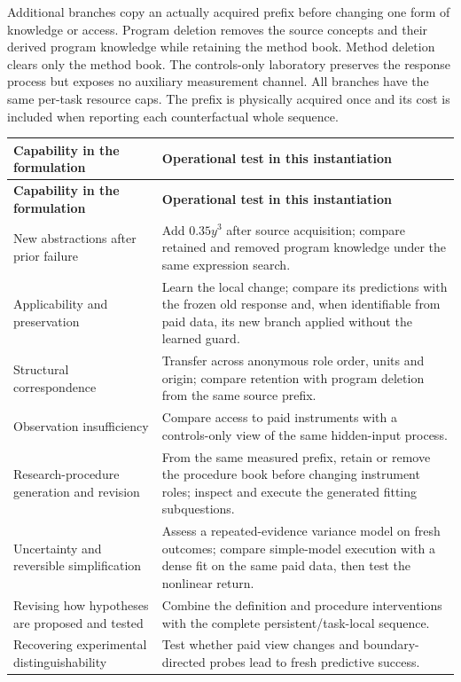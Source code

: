 \documentclass[twoside,11pt]{article}
\begin{document}
Additional branches copy an actually acquired prefix before changing one form
of knowledge or access. Program deletion removes the source concepts and their
derived program knowledge while retaining the method book. Method deletion
clears only the method book. The controls-only laboratory preserves the response
process but exposes no auxiliary measurement channel. All branches have the
same per-task resource caps. The prefix is physically acquired once and its cost
is included when reporting each counterfactual whole sequence.


\begingroup\small\setlength{\tabcolsep}{4pt}
\renewcommand{\arraystretch}{1.18}
\begin{longtable}{@{}>{\raggedright\arraybackslash}p{}>{\raggedright\arraybackslash}p{}@{}}
\toprule
\textbf{Capability in the formulation} & \textbf{Operational test in this instantiation} \\
\midrule\endfirsthead
\toprule
\textbf{Capability in the formulation} & \textbf{Operational test in this instantiation} \\
\midrule\endhead
\bottomrule\endlastfoot
New abstractions after prior failure & Add \(0.35y^3\) after source acquisition; compare retained and removed program knowledge under the same expression search. \\
Applicability and preservation & Learn the local change; compare its predictions with the frozen old response and, when identifiable from paid data, its new branch applied without the learned guard. \\
Structural correspondence & Transfer across anonymous role order, units and origin; compare retention with program deletion from the same source prefix. \\
Observation insufficiency & Compare access to paid instruments with a controls-only view of the same hidden-input process. \\
Research-procedure generation and revision & From the same measured prefix, retain or remove the procedure book before changing instrument roles; inspect and execute the generated fitting subquestions. \\
Uncertainty and reversible simplification & Assess a repeated-evidence variance model on fresh outcomes; compare simple-model execution with a dense fit on the same paid data, then test the nonlinear return. \\
Revising how hypotheses are proposed and tested & Combine the definition and procedure interventions with the complete persistent/task-local sequence. \\
Recovering experimental distinguishability & Test whether paid view changes and boundary-directed probes lead to fresh predictive success. \\
\end{longtable}
\endgroup
\end{document}
